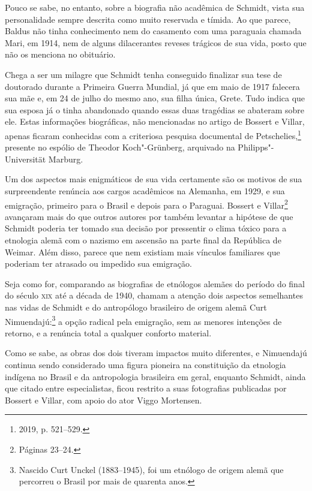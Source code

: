 Pouco se sabe, no entanto, sobre a biografia não acadêmica de Schmidt, vista sua personalidade sempre descrita como muito reservada e tímida. Ao que parece, Baldus não tinha conhecimento nem do casamento com uma paraguaia chamada Mari, em 1914, nem de alguns dilacerantes reveses trágicos de sua vida, posto que não os menciona no obituário.

Chega a ser um milagre que Schmidt tenha conseguido finalizar sua tese de doutorado durante a Primeira Guerra Mundial, já que em maio de 1917 falecera sua mãe e, em 24 de julho do mesmo ano, sua filha única, Grete. Tudo indica que sua esposa já o tinha abandonado quando essas duas tragédias se abateram sobre ele. Estas informações biográficas, não mencionadas no artigo de Bossert e Villar, apenas ficaram conhecidas com a criteriosa pesquisa documental de Petschelies,\footnote{2019, p. 521--529.} presente no espólio de Theodor Koch"-Grünberg, arquivado na Philipps"-Universität Marburg.

Um dos aspectos mais enigmáticos de sua vida certamente são os motivos de sua surpreendente renúncia aos cargos acadêmicos na Alemanha, em 1929, e sua emigração, primeiro para o Brasil e depois para o Paraguai. Bossert e Villar\footnote{Páginas 23--24.} avançaram mais do que outros autores por também levantar a hipótese de que Schmidt poderia ter tomado sua decisão por pressentir o clima tóxico para a etnologia alemã com o nazismo em ascensão na parte final da República de Weimar. Além disso, parece que nem existiam mais vínculos familiares que poderiam ter atrasado ou impedido sua emigração.

Seja como for, comparando as biografias de etnólogos alemães do período do final do século \textsc{xix} até a década de 1940, chamam a atenção dois aspectos semelhantes nas vidas de Schmidt e do antropólogo brasileiro de origem alemã Curt Nimuendajú:\footnote{Nascido Curt Unckel (1883--1945), foi um etnólogo de origem alemã que percorreu o Brasil por mais de quarenta anos.} a opção radical pela emigração, sem as menores intenções de retorno, e a renúncia total a qualquer conforto material. 

Como se sabe, as obras dos dois tiveram impactos muito diferentes, e Nimuendajú continua sendo considerado uma figura pioneira na constituição da etnologia indígena no Brasil e da antropologia brasileira em geral, enquanto Schmidt, ainda que citado entre especialistas, ficou restrito a suas fotografias publicadas por Bossert e Villar, com apoio do ator Viggo Mortensen.

